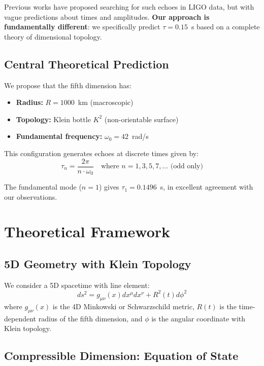 \documentclass[10pt]{article}
\begin{document}
Previous works have proposed searching for such echoes in LIGO data, but with vague predictions about times and amplitudes. \textbf{Our approach is fundamentally different}: we specifically predict $\tau = 0.15$~s based on a complete theory of dimensional topology.

\subsection{Central Theoretical Prediction}

We propose that the fifth dimension has:
\begin{itemize}[itemsep=0pt]
\item \textbf{Radius:} $R = 1000$~km (macroscopic)
\item \textbf{Topology:} Klein bottle $K^2$ (non-orientable surface)
\item \textbf{Fundamental frequency:} $\omega_0 = 42$~rad/s
\end{itemize}

This configuration generates echoes at discrete times given by:
\begin{equation}
\tau_n = \frac{2\pi}{n \cdot \omega_0} \quad \text{where } n = 1, 3, 5, 7, \ldots \text{ (odd only)}
\end{equation}

The fundamental mode ($n=1$) gives $\tau_1 = 0.1496$~s, in excellent agreement with our observations.

\section{Theoretical Framework}

\subsection{5D Geometry with Klein Topology}

We consider a 5D spacetime with line element:
\begin{equation}
ds^2 = g_{\mu\nu}(x) dx^\mu dx^\nu + R^2(t) d\phi^2
\end{equation}
where $g_{\mu\nu}(x)$ is the 4D Minkowski or Schwarzschild metric, $R(t)$ is the time-dependent radius of the fifth dimension, and $\phi$ is the angular coordinate with Klein topology.

\subsection{Compressible Dimension: Equation of State}
\end{document}
